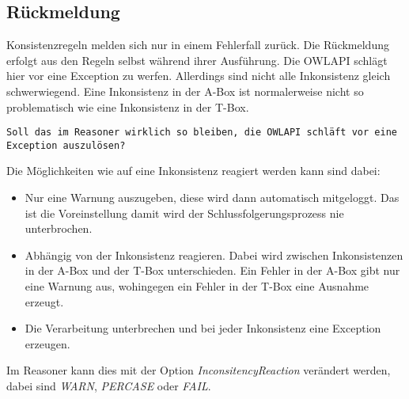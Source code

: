 \subsection{Rückmeldung}
Konsistenzregeln melden sich nur in einem Fehlerfall zurück. Die Rückmeldung erfolgt aus den Regeln selbst während ihrer Ausführung. Die OWLAPI schlägt hier vor eine Exception zu werfen. Allerdings sind nicht alle Inkonsistenz gleich schwerwiegend. Eine Inkonsistenz in der A-Box ist normalerweise nicht so problematisch wie eine Inkonsistenz in der T-Box.

\begin{verbatim}
Soll das im Reasoner wirklich so bleiben, die OWLAPI schläft vor eine Exception auszulösen?
\end{verbatim}

Die Möglichkeiten wie auf eine Inkonsistenz reagiert werden kann sind dabei:
\begin{itemize}
  \item Nur eine Warnung auszugeben, diese wird dann automatisch mitgeloggt. Das ist die Voreinstellung damit wird der Schlussfolgerungsprozess nie unterbrochen.
  \item Abhängig von der Inkonsistenz reagieren. Dabei wird zwischen Inkonsistenzen in der A-Box und der T-Box unterschieden. Ein Fehler in der A-Box gibt nur eine Warnung aus, wohingegen ein Fehler in der T-Box eine Ausnahme erzeugt.
  \item Die Verarbeitung unterbrechen und bei jeder Inkonsistenz eine Exception erzeugen.
\end{itemize}

Im Reasoner kann dies mit der Option \emph{InconsitencyReaction} verändert werden, dabei sind \emph{WARN}, \emph{PERCASE} oder \emph{FAIL}.

